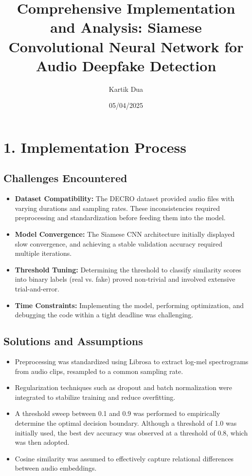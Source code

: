 \documentclass{article}
\title{Comprehensive Implementation and Analysis: Siamese Convolutional Neural Network for Audio Deepfake Detection}
\author{Kartik Dua}
\date{05/04/2025}
\begin{document}
\maketitle

\section*{1. Implementation Process}

\subsection*{Challenges Encountered}
\begin{itemize}
\item \textbf{Dataset Compatibility:} The DECRO dataset provided audio files with varying durations and sampling rates. These inconsistencies required preprocessing and standardization before feeding them into the model.
\item \textbf{Model Convergence:} The Siamese CNN architecture initially displayed slow convergence, and achieving a stable validation accuracy required multiple iterations.
\item \textbf{Threshold Tuning:} Determining the threshold to classify similarity scores into binary labels (real vs. fake) proved non-trivial and involved extensive trial-and-error.
\item \textbf{Time Constraints:} Implementing the model, performing optimization, and debugging the code within a tight deadline was challenging.
\end{itemize}

\subsection*{Solutions and Assumptions}
\begin{itemize}
\item Preprocessing was standardized using Librosa to extract log-mel spectrograms from audio clips, resampled to a common sampling rate.
\item Regularization techniques such as dropout and batch normalization were integrated to stabilize training and reduce overfitting.
\item A threshold sweep between 0.1 and 0.9 was performed to empirically determine the optimal decision boundary. Although a threshold of 1.0 was initially used, the best dev accuracy was observed at a threshold of 0.8, which was then adopted.
\item Cosine similarity was assumed to effectively capture relational differences between audio embeddings.
\end{itemize}
\end{document}
